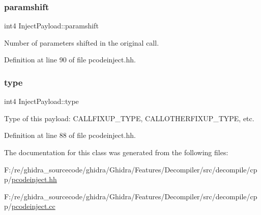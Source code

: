 \subsubsection{\texorpdfstring{paramshift}{paramshift}}
{\footnotesize\ttfamily int4 Inject\+Payload\+::paramshift\hspace{0.3cm}{\ttfamily [protected]}}



Number of parameters shifted in the original call. 



Definition at line 90 of file pcodeinject.\+hh.

\mbox{\label{class_inject_payload_a70d3a35fd2195fe1fb671e6280780e5b}} 
\subsubsection{\texorpdfstring{type}{type}}
{\footnotesize\ttfamily int4 Inject\+Payload\+::type\hspace{0.3cm}{\ttfamily [protected]}}



Type of this payload\+: C\+A\+L\+L\+F\+I\+X\+U\+P\+\_\+\+T\+Y\+PE, C\+A\+L\+L\+O\+T\+H\+E\+R\+F\+I\+X\+U\+P\+\_\+\+T\+Y\+PE, etc. 



Definition at line 88 of file pcodeinject.\+hh.



The documentation for this class was generated from the following files\+:\begin{DoxyCompactItemize}
\item 
F\+:/re/ghidra\+\_\+sourcecode/ghidra/\+Ghidra/\+Features/\+Decompiler/src/decompile/cpp/\mbox{\hyperlink{pcodeinject_8hh}{pcodeinject.\+hh}}\item 
F\+:/re/ghidra\+\_\+sourcecode/ghidra/\+Ghidra/\+Features/\+Decompiler/src/decompile/cpp/\mbox{\hyperlink{pcodeinject_8cc}{pcodeinject.\+cc}}\end{DoxyCompactItemize}
